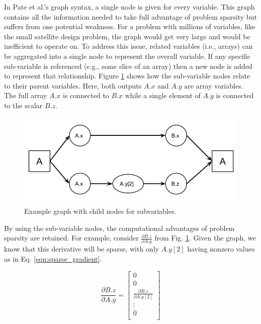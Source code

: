 \documentclass[]{aiaa-tc} %
\begin{document}
    In Pate et al.'s graph syntax, a single node is given for every variable. This graph contains all the
    information needed to take full advantage of problem sparsity but suffers from one potential
    weakness. For a problem with millions of  variables, like the small satellite design problem,
    the graph would get very large and would be inefficient to operate on. To address this issue,
    related variables (i.e., arrays) can be aggregated into a single node to represent the
    overall variable. If any specific sub-variable is referenced (e.g., some slice of an array) 
    then a new node is added to represent that relationship.
    Figure \ref{fig:subvars} shows how the sub-variable nodes relate to their parent variables. Here,
    both outputs $A.x$ and $A.y$ are array variables. The full array $A.x$ is connected to
    $B.x$ while a single element of $A.y$ is connected to the scalar $B.z$.

    \begin{figure}[!htb]\begin{center}
      \includegraphics[width=.8\textwidth]{images/sub-var-node-graph}
      \caption{ Example graph with child nodes for subvariables. \label{fig:subvars}}
    \end{center}\end{figure}

    By using the sub-variable nodes, the computational advantages of problem sparsity are retained. For example,
    consider $\frac{\partial B.z}{\partial A.y}$ from Fig. \ref{fig:subvars}. Given the graph, we know that
    this derivative will be sparse, with only $A.y[2]$ having nonzero values as in Eq.  \ref{eqn:sparse_gradient}.

    \begin{equation}
        \frac{\partial B.z}{\partial A.y} =
        \begin{bmatrix}
            0 \\
            0 \\
            \frac{\partial B.z}{\partial A.y[2]} \\
            \vdots \\
            0 \\
        \end{bmatrix}
        \label{eqn:sparse_gradient}
    \end{equation}
\end{document}
